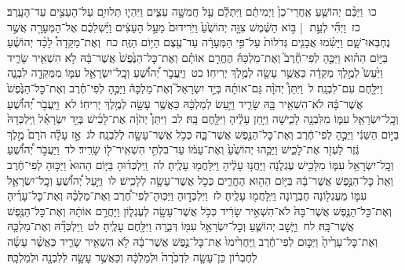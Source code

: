 \documentclass[18pt]{article}
\begin{document}
 {\loc כו~}וַיַּכֵּ֨ם יְהוֹשֻׁ֤עַ אַֽחֲרֵי־כֵן֙ וַיְמִיתֵ֔ם וַיִּתְלֵ֕ם עַ֖ל חֲמִשָּׁ֣ה עֵצִ֑ים וַיִּהְי֛וּ תְּלוּיִ֥ם עַל־הָעֵצִ֖ים עַד־הָעָֽרֶב׃ \startlock
 {\loc כז~}וַיְהִ֞י לְעֵ֣ת  |  בּ֣וֹא הַשֶּׁ֗מֶשׁ צִוָּ֤ה יְהוֹשֻׁ֙עַ֙ וַיֹּֽרִידוּם֙ מֵעַ֣ל הָעֵצִ֔ים וַיַּ֨שְׁלִכֻ֔ם אֶל־הַמְּעָרָ֖ה אֲשֶׁ֣ר נֶחְבְּאוּ־שָׁ֑ם וַיָּשִׂ֜מוּ אֲבָנִ֤ים גְּדֹלוֹת֙ עַל־פִּ֣י הַמְּעָרָ֔ה עַד־עֶ֖צֶם הַיּ֥וֹם הַזֶּֽה׃ \startlock
 {\loc כח~}וְאֶת־מַקֵּדָה֩ לָכַ֨ד יְהוֹשֻׁ֜עַ בַּיּ֣וֹם הַה֗וּא וַיַּכֶּ֣הָ לְפִי־חֶ֘רֶב֮ וְאֶת־מַלְכָּהּ֒ הֶחֱרִ֣ם אוֹתָ֗ם וְאֶת־כׇּל־הַנֶּ֙פֶשׁ֙ אֲשֶׁר־בָּ֔הּ לֹ֥א הִשְׁאִ֖יר שָׂרִ֑יד וַיַּ֙עַשׂ֙ לְמֶ֣לֶךְ מַקֵּדָ֔ה כַּאֲשֶׁ֥ר עָשָׂ֖ה לְמֶ֥לֶךְ יְרִיחֽוֹ׃ \startlock
 {\loc כט~}וַיַּֽעֲבֹ֣ר יְ֠הוֹשֻׁ֠עַ וְכׇֽל־יִשְׂרָאֵ֥ל עִמּ֛וֹ מִמַּקֵּדָ֖ה לִבְנָ֑ה וַיִּלָּ֖חֶם עִם־לִבְנָֽה׃ \startlock
 {\loc ל~}וַיִּתֵּן֩ יְהֹוָ֨ה גַּם־אוֹתָ֜הּ בְּיַ֣ד יִשְׂרָאֵל֮ וְאֶת־מַלְכָּהּ֒ וַיַּכֶּ֣הָ לְפִי־חֶ֗רֶב וְאֶת־כׇּל־הַנֶּ֙פֶשׁ֙ אֲשֶׁר־בָּ֔הּ לֹא־הִשְׁאִ֥יר בָּ֖הּ שָׂרִ֑יד וַיַּ֣עַשׂ לְמַלְכָּ֔הּ כַּאֲשֶׁ֥ר עָשָׂ֖ה לְמֶ֥לֶךְ יְרִיחֽוֹ׃ \startlock
 {\loc לא~}וַיַּֽעֲבֹ֣ר יְ֠הוֹשֻׁ֠עַ וְכׇֽל־יִשְׂרָאֵ֥ל עִמּ֛וֹ מִלִּבְנָ֖ה לָכִ֑ישָׁה וַיִּ֣חַן עָלֶ֔יהָ וַיִּלָּ֖חֶם בָּֽהּ׃ \startlock
 {\loc לב~}וַיִּתֵּן֩ יְהֹוָ֨ה אֶת־לָכִ֜ישׁ בְּיַ֣ד יִשְׂרָאֵ֗ל וַֽיִּלְכְּדָהּ֙ בַּיּ֣וֹם הַשֵּׁנִ֔י וַיַּכֶּ֣הָ לְפִי־חֶ֔רֶב וְאֶת־כׇּל־הַנֶּ֖פֶשׁ אֲשֶׁר־בָּ֑הּ כְּכֹ֥ל אֲשֶׁר־עָשָׂ֖ה לְלִבְנָֽה׃ \startlock
 {\loc לג~}אָ֣ז עָלָ֗ה הֹרָם֙ מֶ֣לֶךְ גֶּ֔זֶר לַעְזֹ֖ר אֶת־לָכִ֑ישׁ וַיַּכֵּ֤הוּ יְהוֹשֻׁ֙עַ֙ וְאֶת־עַמּ֔וֹ עַד־בִּלְתִּ֥י הִשְׁאִֽיר־ל֖וֹ שָׂרִֽיד׃ \startlock
 {\loc לד~}וַיַּעֲבֹ֣ר יְ֠הוֹשֻׁ֠עַ וְכׇֽל־יִשְׂרָאֵ֥ל עִמּ֛וֹ מִלָּכִ֖ישׁ עֶגְלֹ֑נָה וַיַּחֲנ֣וּ עָלֶ֔יהָ וַיִּֽלָּחֲמ֖וּ עָלֶֽיהָ׃ \startlock
 {\loc לה~}וַֽיִּלְכְּד֜וּהָ בַּיּ֤וֹם הַהוּא֙ וַיַּכּ֣וּהָ לְפִי־חֶ֔רֶב וְאֵת֙ כׇּל־הַנֶּ֣פֶשׁ אֲשֶׁר־בָּ֔הּ בַּיּ֥וֹם הַה֖וּא הֶחֱרִ֑ים כְּכֹ֥ל אֲשֶׁר־עָשָׂ֖ה לְלָכִֽישׁ׃ \startlock
 {\loc לו~}וַיַּ֣עַל יְ֠הוֹשֻׁ֠עַ וְכׇֽל־יִשְׂרָאֵ֥ל עִמּ֛וֹ מֵעֶגְל֖וֹנָה חֶבְר֑וֹנָה וַיִּֽלָּחֲמ֖וּ עָלֶֽיהָ׃ \startlock
 {\loc לז~}וַיִּלְכְּד֣וּהָ וַיַּכּֽוּהָ־לְפִי־חֶ֠רֶב וְאֶת־מַלְכָּ֨הּ וְאֶת־כׇּל־עָרֶ֜יהָ וְאֶת־כׇּל־הַנֶּ֤פֶשׁ אֲשֶׁר־בָּהּ֙ לֹא־הִשְׁאִ֣יר שָׂרִ֔יד כְּכֹ֥ל אֲשֶׁר־עָשָׂ֖ה לְעֶגְל֑וֹן וַיַּחֲרֵ֣ם אוֹתָ֔הּ וְאֶת־כׇּל־הַנֶּ֖פֶשׁ אֲשֶׁר־בָּֽהּ׃ \startlock
 {\loc לח~}וַיָּ֧שׇׁב יְהוֹשֻׁ֛עַ וְכׇל־יִשְׂרָאֵ֥ל עִמּ֖וֹ דְּבִ֑רָה וַיִּלָּ֖חֶם עָלֶֽיהָ׃ \startlock
 {\loc לט~}וַֽיִּלְכְּדָ֞הּ וְאֶת־מַלְכָּ֤הּ וְאֶת־כׇּל־עָרֶ֙יהָ֙ וַיַּכּ֣וּם לְפִי־חֶ֔רֶב וַֽיַּחֲרִ֙ימוּ֙ אֶת־כׇּל־נֶ֣פֶשׁ אֲשֶׁר־בָּ֔הּ לֹ֥א הִשְׁאִ֖יר שָׂרִ֑יד כַּאֲשֶׁ֨ר עָשָׂ֜ה לְחֶבְר֗וֹן כֵּן־עָשָׂ֤ה לִדְבִ֙רָה֙ וּלְמַלְכָּ֔הּ וְכַאֲשֶׁ֥ר עָשָׂ֛ה לְלִבְנָ֖ה וּלְמַלְכָּֽהּ׃ \startlock
\end{document}
